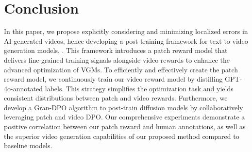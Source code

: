 \section{Conclusion}
In this paper, we propose explicitly considering and minimizing localized errors in AI-generated videos, hence developing a post-training framework for text-to-video generation models, \ours{}. 
This framework introduces a patch reward model that delivers fine-grained training signals alongside video rewards to enhance the advanced optimization of VGMs. To efficiently and effectively create the patch reward model, we continuously train our video reward model by distilling GPT-4o-annotated labels. This strategy simplifies the optimization task and yields consistent distributions between patch and video rewards. Furthermore, we develop a Gran-DPO algorithm to post-train diffusion models by collaboratively leveraging patch and video DPO. Our comprehensive experiments demonstrate a positive correlation between our patch reward and human annotations, as well as the superior video generation capabilities of our proposed method compared to baseline models. 
